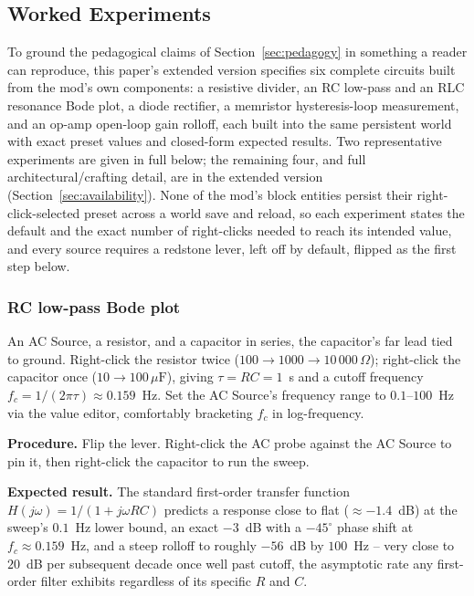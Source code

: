\subsection{Worked Experiments}
\label{sec:experiments}

To ground the pedagogical claims of Section~\ref{sec:pedagogy} in something a reader can
reproduce, this paper's extended version specifies six complete circuits built from the
mod's own components: a resistive divider, an RC low-pass and an RLC resonance Bode plot, a
diode rectifier, a memristor hysteresis-loop measurement, and an op-amp open-loop gain
rolloff, each built into the same persistent world with exact preset values and closed-form
expected results. Two representative experiments are given in full below; the remaining four,
and full architectural/crafting detail, are in the extended version
(Section~\ref{sec:availability}). None of the mod's block entities persist their
right-click-selected preset across a world save and reload, so each experiment states the
default and the exact number of right-clicks needed to reach its intended value, and every
source requires a redstone lever, left off by default, flipped as the first step below.

\subsubsection{RC low-pass Bode plot}
\label{sec:exp-rc}

An AC Source, a resistor, and a capacitor in series, the capacitor's far lead tied to ground.
Right-click the resistor twice ($100\to1000\to10\,000\,\Omega$); right-click the capacitor
once ($10\to100\,\mu\text{F}$), giving $\tau=RC=1$~s and a cutoff frequency
$f_c=1/(2\pi\tau)\approx0.159$~Hz. Set the AC Source's frequency range to $0.1$--$100$~Hz via
the value editor, comfortably bracketing $f_c$ in log-frequency.

\textbf{Procedure.} Flip the lever. Right-click the AC probe against the AC Source to pin it,
then right-click the capacitor to run the sweep.

\textbf{Expected result.} The standard first-order transfer function
$H(j\omega)=1/(1+j\omega RC)$ predicts a response close to flat ($\approx-1.4$~dB) at the
sweep's $0.1$~Hz lower bound, an exact $-3$~dB with a $-45^\circ$ phase shift at
$f_c\approx0.159$~Hz, and a steep rolloff to roughly $-56$~dB by $100$~Hz -- very close to
$20$~dB per subsequent decade once well past cutoff, the asymptotic rate any first-order
filter exhibits regardless of its specific $R$ and $C$.

